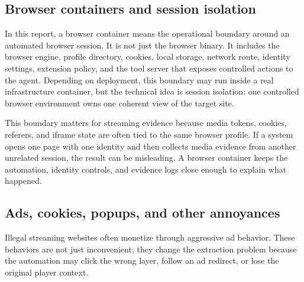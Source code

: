 \subsection{Browser containers and session isolation}

In this report, a browser container means the operational boundary around an automated
browser session. It is not just the browser binary. It includes the browser engine,
profile directory, cookies, local storage, network route, identity settings, extension
policy, and the tool server that exposes controlled actions to the agent. Depending on
deployment, this boundary may run inside a real infrastructure container, but the
technical idea is session isolation: one controlled browser environment owns one coherent
view of the target site.

This boundary matters for streaming evidence because media tokens, cookies, referers,
and iframe state are often tied to the same browser profile. If a system opens one page
with one identity and then collects media evidence from another unrelated session, the
result can be misleading. A browser container keeps the automation, identity controls,
and evidence logs close enough to explain what happened.



\subsection{Ads, cookies, popups, and other annoyances}

Illegal streaming websites often monetize through aggressive ad behavior. These
behaviors are not just inconvenient; they change the extraction problem because the
automation may click the wrong layer, follow an ad redirect, or lose the original player
context.

